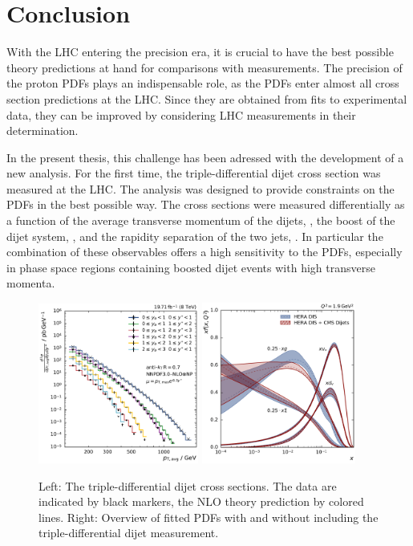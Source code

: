 
\chapter{Conclusion}

With the LHC entering the precision era, it is crucial to have the best possible
theory predictions at hand for comparisons with measurements. The precision of
the proton PDFs plays an indispensable role, as the PDFs enter almost all cross section
predictions at the LHC. Since they are obtained from fits to experimental data,
they can be improved by considering LHC measurements in their
determination.

In the present thesis, this challenge has been adressed with the development of a new
analysis. For the first time, the triple-differential dijet cross section was
measured at the LHC. The analysis was designed to provide constraints on the PDFs in
the best possible way. The cross sections were measured differentially as
a function of the average transverse momentum of the dijets, \ptavg, the boost
of the dijet system, \yboost, and the rapidity separation of the two jets,
\ystar. In particular the combination of these
observables offers a high sensitivity to the PDFs, especially in phase space
regions containing boosted dijet events with high transverse momenta.


\begin{figure}[h!tbp]
    \centering
    \includegraphics[width=0.47\textwidth]{figures/measurement/ptavg_spectrum.pdf}\hfill
    \includegraphics[width=0.45\textwidth]{figures/pdf_constraints/pdfcomp_direct_overview_1.9.pdf}
    \caption[Summary plot of results]{Left:
    The triple-differential dijet cross sections. The data are indicated by black
    markers, the NLO theory prediction by colored lines. Right: Overview of
    fitted PDFs with and without including the triple-differential dijet
    measurement.}
    \label{fig:conclusion}
\end{figure}


